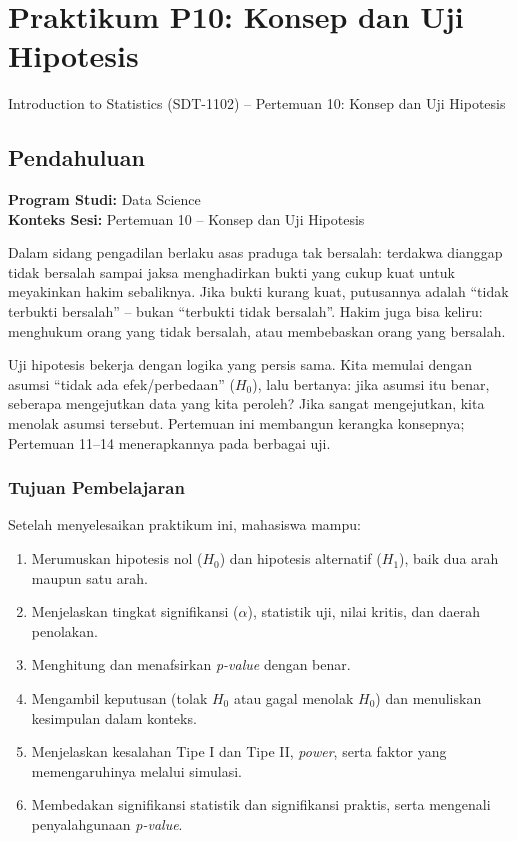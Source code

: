 \documentclass[
  indonesian,
  letterpaper,
]{book}
\providecommand{\tightlist}{%
  \setlength{\itemsep}{0pt}\setlength{\parskip}{0pt}}
\begin{document}

\chapter{Praktikum P10: Konsep dan Uji
Hipotesis}\label{praktikum-p10-konsep-dan-uji-hipotesis}

Introduction to Statistics (SDT-1102) -- Pertemuan 10: Konsep dan Uji
Hipotesis

\hfill\break

\section{Pendahuluan}\label{pendahuluan-1}

\textbf{Program Studi:} Data Science\\
\textbf{Konteks Sesi:} Pertemuan 10 -- Konsep dan Uji Hipotesis

Dalam sidang pengadilan berlaku asas praduga tak bersalah: terdakwa
dianggap tidak bersalah sampai jaksa menghadirkan bukti yang cukup kuat
untuk meyakinkan hakim sebaliknya. Jika bukti kurang kuat, putusannya
adalah ``tidak terbukti bersalah'' -- bukan ``terbukti tidak bersalah''.
Hakim juga bisa keliru: menghukum orang yang tidak bersalah, atau
membebaskan orang yang bersalah.

Uji hipotesis bekerja dengan logika yang persis sama. Kita memulai
dengan asumsi ``tidak ada efek/perbedaan'' (\(H_0\)), lalu bertanya:
jika asumsi itu benar, seberapa mengejutkan data yang kita peroleh? Jika
sangat mengejutkan, kita menolak asumsi tersebut. Pertemuan ini
membangun kerangka konsepnya; Pertemuan 11--14 menerapkannya pada
berbagai uji.

\subsection{Tujuan Pembelajaran}\label{tujuan-pembelajaran-1}

Setelah menyelesaikan praktikum ini, mahasiswa mampu:

\begin{enumerate}
\def\labelenumi{\arabic{enumi}.}
\tightlist
\item
  Merumuskan hipotesis nol (\(H_0\)) dan hipotesis alternatif (\(H_1\)),
  baik dua arah maupun satu arah.
\item
  Menjelaskan tingkat signifikansi (\(\alpha\)), statistik uji, nilai
  kritis, dan daerah penolakan.
\item
  Menghitung dan menafsirkan \emph{p-value} dengan benar.
\item
  Mengambil keputusan (tolak \(H_0\) atau gagal menolak \(H_0\)) dan
  menuliskan kesimpulan dalam konteks.
\item
  Menjelaskan kesalahan Tipe I dan Tipe II, \emph{power}, serta faktor
  yang memengaruhinya melalui simulasi.
\item
  Membedakan signifikansi statistik dan signifikansi praktis, serta
  mengenali penyalahgunaan \emph{p-value}.
\end{enumerate}
\end{document}
